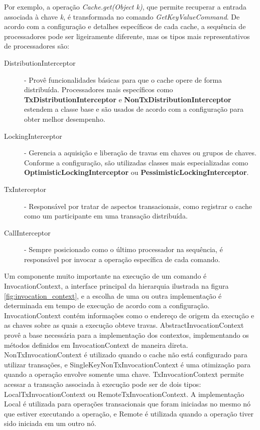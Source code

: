 \documentclass[11pt,twoside,a4paper]{book}
\begin{document}
Por exemplo, a operação \emph{Cache.get(Object k)}, que permite recuperar a entrada associada à chave \emph{k}, é transformada no comando \emph{GetKeyValueCommand}. De acordo com a configuração e detalhes específicos de cada cache, a sequência de processadores pode ser ligeiramente diferente, mas os tipos mais representativos de processadores são:

\begin{description} 
	\item[DistributionInterceptor] - Provê funcionalidades básicas para que o cache opere de forma distribuída. Processadores mais específicos como \textbf{TxDistributionInterceptor} e \textbf{NonTxDistributionInterceptor} estendem a classe base e são usados de acordo com a configuração para obter melhor desempenho.
	\item[LockingInterceptor] - Gerencia a aquisição e liberação de travas em chaves ou grupos de chaves. Conforme a configuração, são utilizadas classes mais especializadas como \textbf{OptimisticLockingInterceptor} ou \textbf{PessimisticLockingInterceptor}.
	\item[TxInterceptor] - Responsável por tratar de aspectos transacionais, como registrar o cache como um participante em uma transação distribuída.
	\item[CallInterceptor] - Sempre posicionado como o último processador na sequência, é responsável por invocar a operação específica de cada comando.
\end{description}

Um componente muito importante na execução de um comando é InvocationContext, a interface principal da hierarquia ilustrada na figura \ref{fig:invocation_context}, e a escolha de uma ou outra implementação é determinada em tempo de execução de acordo com a configuração. InvocationContext contém informações como o endereço de origem da execução e as chaves sobre as quais a execução obteve travas. AbstractInvocationContext provê a base necessária para a implementação dos contextos, implementando os métodos definidos em InvocationContext de maneira direta. NonTxInvocationContext é utilizado quando o cache não está configurado para utilizar transações, e SingleKeyNonTxInvocationContext é uma otimização para quando a operação envolve somente uma chave. TxInvocationContext permite acessar a transação associada à execução pode ser de dois tipos: LocalTxInvocationContext ou RemoteTxInvocationContext. A implementação Local é utilizada para operações transacionais que foram iniciadas no mesmo nó que estiver executando a operação, e Remote é utilizada quando a operação tiver sido iniciada em um outro nó. 
\end{document}
